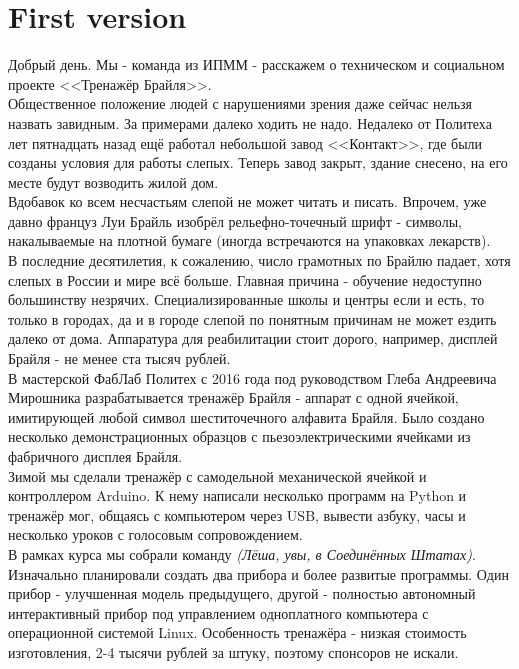\documentclass[a4paper,12pt]{article} %
\begin{document}
\section{First version}
Добрый день. Мы - команда из ИПММ - расскажем о техническом и социальном проекте <<Тренажёр Брайля>>.\\ %
Общественное положение людей с нарушениями зрения даже сейчас нельзя назвать завидным. За примерами далеко ходить не надо. Недалеко от Политеха лет пятнадцать назад ещё работал небольшой завод <<Контакт>>, где были созданы условия для работы слепых. Теперь завод закрыт, здание снесено, на его месте будут возводить жилой дом.\\ %
Вдобавок ко всем несчастьям слепой не может читать и писать. Впрочем, уже давно француз Луи Брайль изобрёл рельефно-точечный шрифт - символы, накалываемые на плотной бумаге (иногда встречаются на упаковках лекарств).\\ %
В последние десятилетия, к сожалению, число грамотных по Брайлю падает, хотя слепых в России и мире всё больше. Главная причина - обучение недоступно большинству незрячих. Специализированные школы и центры если и есть, то только в городах, да и в городе слепой по понятным причинам не может ездить далеко от дома. Аппаратура для реабилитации стоит дорого, например, дисплей Брайля - не менее ста тысяч рублей.\\ %
В мастерской ФабЛаб Политех с 2016 года под руководством Глеба Андреевича Мирошника разрабатывается тренажёр Брайля - аппарат с одной ячейкой, имитирующей любой символ шеститочечного алфавита Брайля. Было создано несколько демонстрационных образцов с пьезоэлектрическими ячейками из фабричного дисплея Брайля.\\ %
Зимой мы сделали тренажёр с самодельной механической ячейкой и контроллером Arduino. К нему написали несколько программ на Python и тренажёр мог, общаясь с компьютером через USB, вывести азбуку, часы и несколько уроков с голосовым сопровождением. \\ %
В рамках курса мы собрали команду \textit{(Лёша, увы, в Соединённых Штатах)}. Изначально планировали создать два прибора и более развитые программы. Один прибор - улучшенная модель предыдущего, другой - полностью автономный интерактивный прибор под управлением одноплатного компьютера с операционной системой Linux. Особенность тренажёра - низкая стоимость изготовления, 2-4 тысячи рублей за штуку, поэтому спонсоров не искали.\\ %
\end{document}
